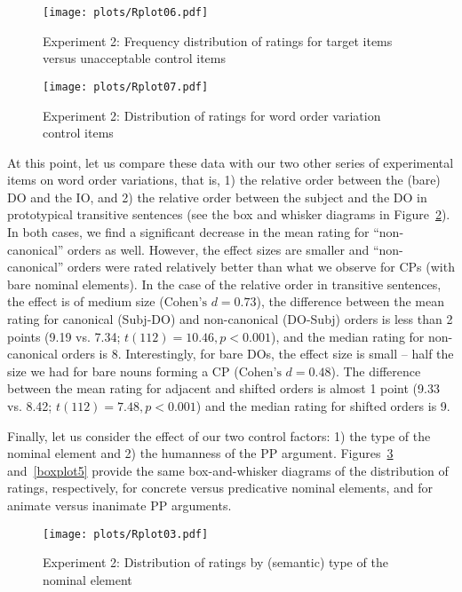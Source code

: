 \documentclass[output=paper]{langsci/langscibook}
\begin{document}
\begin{figure}[p]
          \texttt{[image: plots/Rplot06.pdf]}
	\caption{Experiment 2: Frequency distribution of ratings for target items versus unacceptable control items}\label{barplot1}
\end{figure}

\begin{figure}[p]
    \texttt{[image: plots/Rplot07.pdf]}
	\caption{Experiment 2: Distribution of ratings for word order variation control items}\label{boxplot4}
\end{figure}


At this point, let us compare these data with our two other series of experimental items on word order variations, that is, 1) the relative order between the (bare) DO and the IO, and 2) the relative order between the subject and the DO in prototypical transitive sentences (see the box and whisker diagrams in Figure~\ref{boxplot4}). In both cases, we find a significant decrease in the mean rating for ``non-canonical'' orders as well. However, the effect sizes are smaller and ``non-canonical'' orders were rated relatively better than what we observe for CPs (with bare nominal elements).  
In the case of the relative order in transitive sentences, the effect is of medium size ($\text{Cohen's } d=0.73$), the difference between the mean rating for canonical (Subj-DO) and non-canonical (DO-Subj) orders is less than 2 points (9.19 vs. 7.34; $t(112)= 10.46, p<0.001$), and the median rating for non-canonical orders is 8. 
Interestingly, for bare DOs, the effect size is small -- half the size we had for bare nouns forming a CP ($\text{Cohen's } d=0.48$). The difference between the mean rating  for adjacent and shifted orders is almost 1 point (9.33 vs. 8.42; $t(112)= 7.48, p<0.001$) and the median rating for shifted orders is 9. 


Finally, let us consider the effect of our two control factors: 1) the type of the nominal element and 2) the humanness of the PP argument. Figures~\ref{boxplot3} and~\ref{boxplot5} provide the same box-and-whisker diagrams of the distribution of ratings, respectively, for concrete versus predicative nominal elements, and for animate versus inanimate PP arguments. 


\begin{figure}[p]
	\texttt{[image: plots/Rplot03.pdf]}
	\caption{Experiment 2: Distribution of ratings by (semantic) type of the nominal element}\label{boxplot3}
\end{figure}
\end{document}
